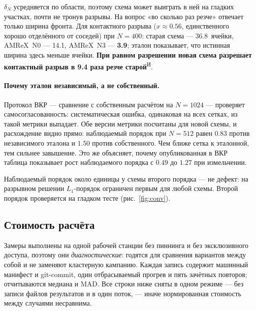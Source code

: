 \documentclass[12pt,a4paper]{article}
\newcommand{\Iz}{\textsuperscript{\scriptsize И}}    %
\begin{document}
$\delta_N$ усредняется по области, поэтому схема может выиграть в ней на гладких
участках, почти не тронув разрывы. На вопрос «во сколько раз резче» отвечает
только ширина фронта. Для контактного разрыва ($x\approx0.56$, единственного
хорошо отделённого от соседей) при $N=400$: старая схема ---
36.8~ячейки, AMReX~N0 --- 14.1, AMReX~N3 --- \textbf{3.9}; эталон показывает, что
истинная ширина здесь меньше ячейки. \textbf{При равном разрешении новая схема
разрешает контактный разрыв в 9.4 раза резче старой}\Iz.

\paragraph{Почему эталон независимый, а не собственный.} Протокол ВКР ---
сравнение с собственным расчётом на $N=1024$ --- проверяет самосогласованность:
систематическая ошибка, одинаковая на всех сетках, из такой метрики выпадает.
Обе версии метрики посчитаны для новой схемы, и расхождение видно прямо:
наблюдаемый порядок при $N=512$ равен $0.83$ против независимого эталона и
$1.50$ против собственного. Чем ближе сетка к эталонной, тем сильнее завышение.
Это же объясняет, почему опубликованная в ВКР таблица показывает рост
наблюдаемого порядка с $0.49$ до $1.27$ при измельчении.

Наблюдаемый порядок около единицы у схемы второго порядка --- не дефект: на
разрывном решении $L_1$-порядок ограничен первым для любой схемы. Второй порядок
проверяется на гладком тесте (рис.~\ref{fig:conv}).

\subsection{Стоимость расчёта}
\label{sec:res-perf}

Замеры выполнены на одной рабочей станции без пиннинга и без эксклюзивного
доступа, поэтому они \emph{диагностические}: годятся для сравнения вариантов
между собой и не заменяют кластерную кампанию. Каждая запись содержит машинный
манифест и git-commit, один отбрасываемый прогрев и пять зачётных повторов;
отчитываются медиана и MAD. Все строки ниже сняты в одном режиме --- без записи
файлов результатов и в один поток, --- иначе нормированная стоимость между
случаями несравнима.
\end{document}
